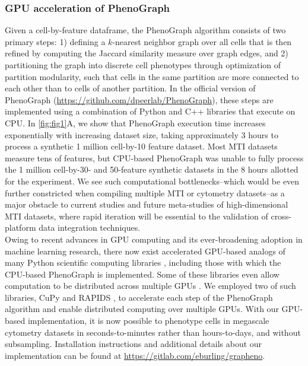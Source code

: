 \documentclass[preprint,review,3p,12pt]{elsarticle}
\begin{document}
\subsubsection{GPU acceleration of PhenoGraph}
Given a cell-by-feature dataframe, the PhenoGraph algorithm \cite{Levine2015} consists of two primary steps: 1) defining a $k$-nearest neighbor graph over all cells that is then refined by computing the Jaccard similarity measure over graph edges, and 2) partitioning the graph into discrete cell phenotypes through optimization of partition modularity, such that cells in the same partition are more connected to each other than to cells of another partition. In the official version of PhenoGraph (\url{https://github.com/dpeerlab/PhenoGraph}), these steps are implemented using a combination of Python and C++ libraries that execute on CPU. In \autoref{fig:fig1}A, we show that PhenoGraph execution time increases exponentially with increasing dataset size, taking approximately 3 hours to process a synthetic 1 million cell-by-10 feature dataset. Most MTI datasets measure tens of features, but CPU-based PhenoGraph was unable to fully process the 1 million cell-by-30- and 50-feature synthetic datasets in the 8 hours allotted for the experiment. We see such computational bottlenecks--which would be even further constricted when compiling multiple MTI or cytometry datasets--as a major obstacle to current studies and future meta-studies of high-dimensional MTI datasets, where rapid iteration will be essential to the validation of cross-platform data integration techniques. \\

Owing to recent advances in GPU computing and its ever-broadening adoption in machine learning research, there now exist accelerated GPU-based analogs of many Python scientific computing libraries \cite{cuml2020,cupy2017}, including those with which the CPU-based PhenoGraph is implemented. Some of these libraries even allow computation to be distributed across multiple GPUs \cite{cuml2020,dask}. We employed two of such libraries, CuPy \cite{cupy2017} and RAPIDS \cite{cuml2020}, to accelerate each step of the PhenoGraph algorithm and enable distributed computing over multiple GPUs. With our GPU-based implementation, it is now possible to phenotype cells in megascale cytometry datasets in seconds-to-minutes rather than hours-to-days, and without subsampling. Installation instructions and additional details about our implementation can be found at \url{https://gitlab.com/eburling/grapheno}.\\
\end{document}
